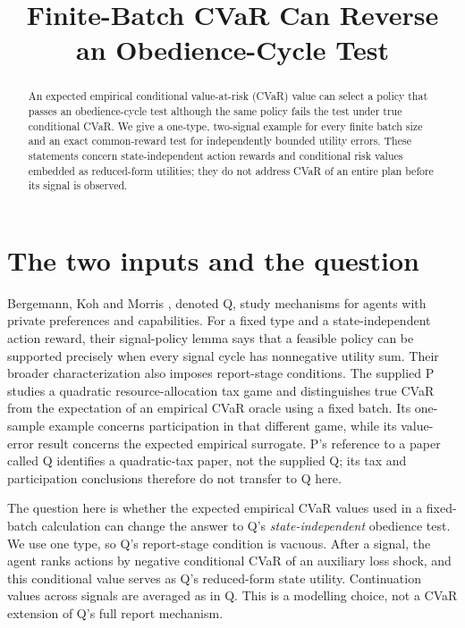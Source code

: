 \documentclass{article}
\title{Finite-Batch CVaR Can Reverse an Obedience-Cycle Test}
\begin{document}
\maketitle

\begin{abstract}
An expected empirical conditional value-at-risk (CVaR) value can select a policy that passes an obedience-cycle test although the same policy fails the test under true conditional CVaR. We give a one-type, two-signal example for every finite batch size and an exact common-reward test for independently bounded utility errors. These statements concern state-independent action rewards and conditional risk values embedded as reduced-form utilities; they do not address CVaR of an entire plan before its signal is observed. %
\end{abstract}

\section{The two inputs and the question}

Bergemann, Koh and Morris \cite{bergemann2026alignment}, denoted Q, study mechanisms for agents with private preferences and capabilities. For a fixed type and a state-independent action reward, their signal-policy lemma says that a feasible policy can be supported precisely when every signal cycle has nonnegative utility sum. Their broader characterization also imposes report-stage conditions. The supplied P \cite{pathfinder2026fixedbatch} studies a quadratic resource-allocation tax game and distinguishes true CVaR from the expectation of an empirical CVaR oracle using a fixed batch. Its one-sample example concerns participation in that different game, while its value-error result concerns the expected empirical surrogate. P's reference to a paper called Q identifies a quadratic-tax paper, not the supplied Q; its tax and participation conclusions therefore do not transfer to Q here. %

The question here is whether the expected empirical CVaR values used in a fixed-batch calculation can change the answer to Q's \emph{state-independent} obedience test. We use one type, so Q's report-stage condition is vacuous. After a signal, the agent ranks actions by negative conditional CVaR of an auxiliary loss shock, and this conditional value serves as Q's reduced-form state utility. Continuation values across signals are averaged as in Q. This is a modelling choice, not a CVaR extension of Q's full report mechanism. %
\end{document}
